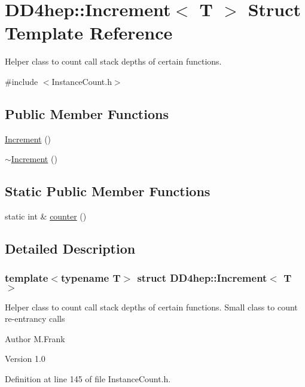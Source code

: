 \hypertarget{struct_d_d4hep_1_1_increment}{
\section{DD4hep::Increment$<$ T $>$ Struct Template Reference}
\label{struct_d_d4hep_1_1_increment}
}


Helper class to count call stack depths of certain functions.  


{\ttfamily \#include $<$InstanceCount.h$>$}\subsection*{Public Member Functions}
\begin{DoxyCompactItemize}
\item 
\hyperlink{struct_d_d4hep_1_1_increment_a50a4d78633dc0e8b3eca298c9e09bbb8}{Increment} ()
\item 
\hyperlink{struct_d_d4hep_1_1_increment_ad2148abb952e3dbd20b46c081851affc}{$\sim$Increment} ()
\end{DoxyCompactItemize}
\subsection*{Static Public Member Functions}
\begin{DoxyCompactItemize}
\item 
static int \& \hyperlink{struct_d_d4hep_1_1_increment_afac4a87bcf31df0fb0053a61ec800048}{counter} ()
\end{DoxyCompactItemize}


\subsection{Detailed Description}
\subsubsection*{template$<$typename T$>$ struct DD4hep::Increment$<$ T $>$}

Helper class to count call stack depths of certain functions. Small class to count re-\/entrancy calls

\begin{DoxyAuthor}{Author}
M.Frank 
\end{DoxyAuthor}
\begin{DoxyVersion}{Version}
1.0 
\end{DoxyVersion}


Definition at line 145 of file InstanceCount.h.

